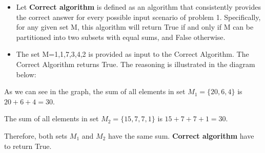 \documentclass{article}
\begin{document}
	\begin{itemize}
		\item Let \textbf{Correct algorithm} is defined as an algorithm that consistently provides the correct answer for every possible input scenario of problem 1. Specifically, for any given set 
		M, this algorithm will return True if and only if 
		M can be partitioned into two subsets with equal sums, and False otherwise.
		\item The set M={1,1,7,3,4,2} is provided as input to the Correct Algorithm.  The Correct Algorithm returns True. The reasoning is illustrated in the diagram below:
	\end{itemize}
	

	As we can see in the graph, the sum of all elements in set \(M_{1} = \{20, 6, 4\}\) is \(20 + 6 + 4 = 30\).

	The sum of all elements in set \(M_{2} = \{15, 7, 7, 1\}\) is \(15 + 7 + 7 + 1 = 30\).

 	Therefore, both sets \(M_{1}\) and \(M_{2}\) have the same sum. \textbf{Correct algorithm} have to return True.
\end{document}
